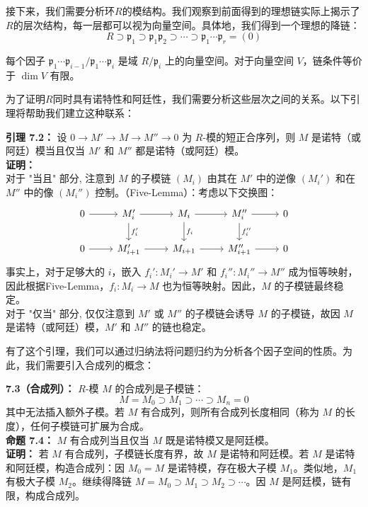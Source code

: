\documentclass[UTF8]{ctexart}
\begin{document}
\begin{enumerate}
\begin{enumerate}
接下来，我们需要分析环$R$的模结构。我们观察到前面得到的理想链实际上揭示了$R$的层次结构，每一层都可以视为向量空间。具体地，我们得到一个理想的降链：
\[
R \supset \mathfrak{p}_1 \supset \mathfrak{p}_1 \mathfrak{p}_2 \supset \cdots \supset \mathfrak{p}_1 \cdots \mathfrak{p}_r = (0)
\]

每个因子 \(\mathfrak{p}_1 \cdots \mathfrak{p}_{i-1} / \mathfrak{p}_1 \cdots \mathfrak{p}_i\) 是域 \(R / \mathfrak{p}_i\) 上的向量空间。对于向量空间 \(V\)，链条件等价于 \(\dim V\) 有限。

为了证明$R$同时具有诺特性和阿廷性，我们需要分析这些层次之间的关系。以下引理将帮助我们建立这种联系：

\textbf{引理 7.2：} 设 \(0 \to M' \to M \to M'' \to 0\) 为 \(R\)-模的短正合序列，则 \(M\) 是诺特（或阿廷）模当且仅当 \(M'\) 和 \(M''\) 都是诺特（或阿廷）模。\\
\textbf{证明：}\\
对于 "当且" 部分, 注意到 \(M\) 的子模链 \((M_i)\) 由其在 \(M'\) 中的逆像 \((M_i')\) 和在 \(M''\) 中的像 \((M_i'')\) 控制。（Five-Lemma）：考虑以下交换图：
\[
\begin{tikzcd}
0 \arrow[r] & M_i' \arrow[r] \arrow[d, "f_i'"] & M_i \arrow[r] \arrow[d, "f_i"] & M_i'' \arrow[r] \arrow[d, "f_i''"] & 0 \\
0 \arrow[r] & M_{i+1}' \arrow[r] & M_{i+1} \arrow[r] & M_{i+1}'' \arrow[r] & 0
\end{tikzcd}
\]
事实上，对于足够大的 \(i\)，嵌入 \(f_i': M_i' \to M'\) 和 \(f_i'': M_i'' \to M''\) 成为恒等映射，因此根据Five-Lemma，\(f_i: M_i \to M\) 也为恒等映射。因此，\(M\) 的子模链最终稳定。\\
对于 "仅当" 部分, 仅仅注意到 \(M'\) 或 \(M''\) 的子模链会诱导 \(M\) 的子模链，故因 \(M\) 是诺特（或阿廷）模，\(M'\) 和 \(M''\) 的链也稳定。

有了这个引理，我们可以通过归纳法将问题归约为分析各个因子空间的性质。为此，我们需要引入合成列的概念：

\textbf{7.3（合成列）：} \(R\)-模 \(M\) 的合成列是子模链：
\[
M = M_0 \supset M_1 \supset \cdots \supset M_n = 0
\]
其中无法插入额外子模。若 \(M\) 有合成列，则所有合成列长度相同（称为 \(M\) 的长度），任何子模链可扩展为合成。\\

\textbf{命题 7.4：} \(M\) 有合成列当且仅当 \(M\) 既是诺特模又是阿廷模。\\
\textbf{证明：} 若 \(M\) 有合成列，子模链长度有界，故 \(M\) 是诺特和阿廷模。若 \(M\) 是诺特和阿廷模，构造合成列：因 \(M_0 = M\) 是诺特模，存在极大子模 \(M_1\)。类似地，\(M_1\) 有极大子模 \(M_2\)。继续得降链 \(M = M_0 \supset M_1 \supset M_2 \supset \cdots\)。因 \(M\) 是阿廷模，链有限，构成合成列。


\end{enumerate}
\end{enumerate}
\end{document}
